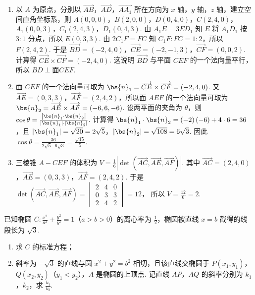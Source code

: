 \begin{solution}
\begin{enumerate}
\item 以 \(A\) 为原点，分别以 \(\overrightarrow{AB}\)，\(\overrightarrow{AD}\)，\(\overrightarrow{AA_1}\) 所在方向为 \(x\) 轴，\(y\) 轴，\(z\) 轴，建立空间直角坐标系，则 \(A(0,0,0)\)，\(B(2,0,0)\)，\(D(0,4,0)\)，\(C(2,4,0)\)，\(A_1(0,0,3)\)，\(C_1(2,4,3)\)，\(D_1(0,4,3)\).
由 \(A_1E=3ED_1\) 知 \(E\) 将 \(A_1D_1\) 按 \(3:1\) 分点，所以 \(E(0,3,3)\). 由 \(2C_1F=FC\) 知 \(C_1F:FC=1:2\)，所以 \(F(2,4,2)\).
于是 \(\overrightarrow{BD}=\left( -2,4,0 \right)\)，\(\overrightarrow{CE}=\left( -2,-1,3 \right)\)，\(\overrightarrow{CF}=\left( 0,0,2 \right)\). 计算得 \(\overrightarrow{CE}\times \overrightarrow{CF}=\left( -2,4,0 \right)\). 这说明 \(\overrightarrow{BD}\) 与平面 \(CEF\) 的一个法向量平行，所以 \(BD\perp \text{面} CEF\).

\item 面 \(CEF\) 的一个法向量可取为 \(\bs{n}_1=\overrightarrow{CE}\times \overrightarrow{CF}=\left( -2,4,0 \right)\).
又 \(\overrightarrow{AE}=\left( 0,3,3 \right)\)，\(\overrightarrow{AF}=\left( 2,4,2 \right)\)，所以面 \(AEF\) 的一个法向量可取为 \(\bs{n}_2=\overrightarrow{AE}\times \overrightarrow{AF}=\left( -6,6,-6 \right)\).
设两平面的夹角为 \(\theta\)，则 \(\cos \theta=\frac{\left| \bs{n}_1\cdot \bs{n}_2 \right|}{|\bs{n}_1|\cdot |\bs{n}_2|}\). 计算得 \(\bs{n}_1\cdot \bs{n}_2=\left( -2 \right)\left( -6 \right)+4\cdot 6=36\)，且 \(|\bs{n}_1|=\sqrt{20}=2\sqrt{5}\)，\(|\bs{n}_2|=\sqrt{108}=6\sqrt{3}\). 因此 \(\cos \theta=\frac{36}{2\sqrt{5}\cdot 6\sqrt{3}}=\frac{\sqrt{15}}{5}\).

\item 三棱锥 \(A-CEF\) 的体积为 \(V=\frac{1}{6}\left| \det \left( \overrightarrow{AC},\overrightarrow{AE},\overrightarrow{AF} \right) \right|\). 其中 \(\overrightarrow{AC}=\left( 2,4,0 \right)\)，\(\overrightarrow{AE}=\left( 0,3,3 \right)\)，\(\overrightarrow{AF}=\left( 2,4,2 \right)\). 于是
\(
\det \left( \overrightarrow{AC},\overrightarrow{AE},\overrightarrow{AF} \right)
=
\begin{vmatrix}
2&4&0\\
0&3&3\\
2&4&2
\end{vmatrix}
=12
\)，
所以 \(V=\frac{12}{6}=2\).
\end{enumerate}
\end{solution}

\begin{problem}
已知椭圆 \(C:\frac{x^2}{a^2}+\frac{y^2}{b^2}=1\)（\(a>b>0\)）的离心率为 \(\frac{1}{2}\)，椭圆被直线 \(x=b\) 截得的线段长为 \(\sqrt{3}\).

\begin{enumerate}
\item 求 \(C\) 的标准方程；
\item 斜率为 \(-\sqrt{3}\) 的直线与圆 \(x^2+y^2=b^2\) 相切，且该直线交椭圆于 \(P(x_1,y_1)\)，\(Q(x_2,y_2)\)（\(y_1<y_2\)），\(A\) 是椭圆的上顶点. 记直线 \(AP\)，\(AQ\) 的斜率分别为 \(k_1\)，\(k_2\)，求 \(\frac{k_1}{k_2}\).
\end{enumerate}
\end{problem}

